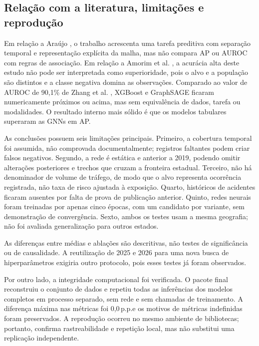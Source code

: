 \documentclass[12pt]{article}
\newcommand{\pp}{\,p.p.}
\begin{document}
\subsection{Relação com a literatura, limitações e reprodução}

Em relação a Araújo \cite{araujo2022}, o trabalho acrescenta uma tarefa
preditiva com separação temporal e representação explícita da malha,
mas não compara AP ou AUROC com regras de associação. Em relação a
Amorim et al. \cite{amorim2023}, a acurácia alta deste estudo não pode
ser interpretada como superioridade, pois o alvo e a população são
distintos e a classe negativa domina as observações. Comparado ao valor
de AUROC de 90,1\% de Zhang et al. \cite{zhang2026}, XGBoost e
GraphSAGE ficaram numericamente próximos ou acima, mas sem equivalência
de dados, tarefa ou modalidades. O resultado interno mais sólido é que
os modelos tabulares superaram as GNNs em AP.

As conclusões possuem seis limitações principais. Primeiro, a cobertura
temporal foi assumida, não comprovada documentalmente; registros
faltantes podem criar falsos negativos. Segundo, a rede é estática e
anterior a 2019, podendo omitir alterações posteriores e trechos que
cruzam a fronteira estadual. Terceiro, não há denominador de volume de
tráfego, de modo que o alvo representa ocorrência registrada, não taxa
de risco ajustada à exposição. Quarto, históricos de acidentes ficaram
ausentes por falta de prova de publicação anterior. Quinto, redes
neurais foram treinadas por apenas cinco épocas, com um candidato por
variante, sem demonstração de convergência. Sexto, ambos os testes usam
a mesma geografia; não foi avaliada generalização para outros estados.

As diferenças entre médias e ablações são descritivas, não testes de
significância ou de causalidade. A reutilização de 2025 e 2026 para uma
nova busca de hiperparâmetros exigiria outro protocolo, pois esses
testes já foram observados.

Por outro lado, a integridade computacional foi verificada. O pacote
final reconstruiu o conjunto de dados e repetiu todas as inferências
dos modelos completos em processo separado, sem rede e sem chamadas de
treinamento. A diferença máxima nas métricas foi 0,0\pp e os motivos de
métricas indefinidas foram preservados. A reprodução ocorreu no mesmo
ambiente de bibliotecas; portanto, confirma rastreabilidade e repetição
local, mas não substitui uma replicação independente.

\end{document}
